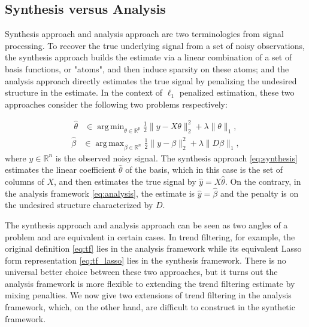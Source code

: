 \documentclass[a4paper]{article}
\DeclareMathOperator*{\argmin}{arg\,min}
\DeclareMathOperator*{\argmax}{arg\,max}
\newcommand{\RR}{\mathbb{R}}
\begin{document}
\subsection{Synthesis versus Analysis}
\label{subsec:syn_vs_ana}
Synthesis approach and analysis approach are two terminologies from signal processing. To recover the true underlying signal from a set of noisy observations, the synthesis approach builds the estimate via a linear combination of a set of basis functions, or "atoms", and then induce sparsity on these atoms; and the analysis approach directly estimates the true signal by penalizing the undesired structure in the estimate. In the context of $\ell_1$ penalized estimation, these two approaches consider the following two problems respectively:

\begin{align}
\hat{\theta} &\in \argmin_{\theta\in\RR^p}\frac{1}{2}\|y-X\theta\|_2^2 + \lambda\|\theta\|_1,
\label{eq:synthesis}
\end{align}
\begin{align}
\hat{\beta} &\in \argmax_{\beta\in\RR^n}\frac{1}{2}\|y-\beta\|_2^2 + \lambda\|D\beta\|_1,
\label{eq:analysis}
\end{align}
where $y\in\RR^n$ is the observed noisy signal. The synthesis approach \eqref{eq:synthesis} estimates the linear coefficient $\hat{\theta}$ of the basis, which in this case is the set of columns of $X$, and then estimates the true signal by $\hat{y} = X\hat{\theta}$. On the contrary, in the analysis framework \eqref{eq:analysis}, the estimate is $\hat{y} = \hat{\beta}$ and the penalty is on the undesired structure characterized by $D$.

The synthesis approach and analysis approach can be seen as two angles of a problem and are equivalent in certain cases. In trend filtering, for example, the original definition \eqref{eq:tf} lies in the analysis framework while its equivalent Lasso form representation \eqref{eq:tf_lasso} lies in the synthesis framework. There is no universal better choice between these two approaches, but it turns out the analysis framework is more flexible to extending the trend filtering estimate by mixing penalties. We now give two extensions of trend filtering in the analysis framework, which, on the other hand, are difficult to construct in the synthetic framework.
\end{document}
